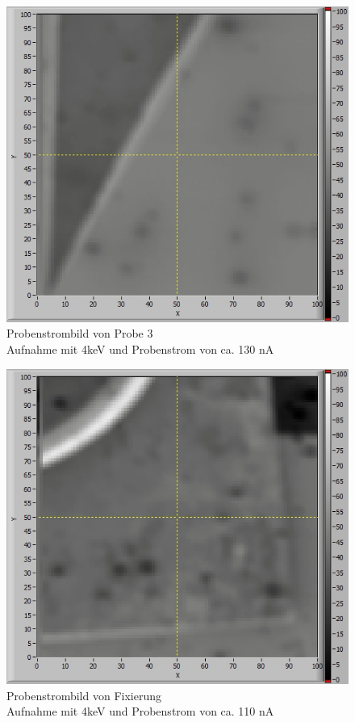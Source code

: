 	\begin{figure}[H]	
		\center
		\includegraphics[scale=0.6]{epic02.jpg}
		\caption{\centering Probenstrombild von Probe 3 \\ Aufnahme mit 4keV und Probenstrom von ca. 130 nA}
	\end{figure}

	\begin{figure}[H]	
		\center
		\includegraphics[scale=0.6]{epicSchraube.jpg}
		\caption{\centering Probenstrombild von Fixierung \\ Aufnahme mit 4keV und Probenstrom von ca. 110 nA}
	\end{figure}

